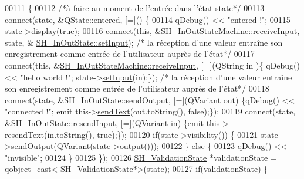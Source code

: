 \begin{DoxyCode}
00111 \{
00112     \textcolor{comment}{/*à faire au moment de l'entrée dans l'état state*/}
00113     connect(state, &QState::entered, [=]() \{
00114         qDebug() << \textcolor{stringliteral}{"entered !"};
00115         state->\hyperlink{classSH__InOutState_a918e8a7f5fe00dc16004e46eeee1281d}{display}(\textcolor{keyword}{true});
00116         connect(\textcolor{keyword}{this}, &\hyperlink{classSH__InOutStateMachine_ab224e4a6ab99c15770bc63e1b8fdb771}{SH\_InOutStateMachine::receiveInput}, state, &
      \hyperlink{classSH__InOutState_a0206ab7d5616f28b0da7bfd5451614e8}{SH\_InOutState::setInput}); \textcolor{comment}{/* la réception d'une valeur entraîne son enregistrement
       comme entrée de l'utilisateur auprès de l'état*/}
00117         connect(\textcolor{keyword}{this}, &\hyperlink{classSH__InOutStateMachine_ab224e4a6ab99c15770bc63e1b8fdb771}{SH\_InOutStateMachine::receiveInput}, [=](QString in
      )\{ qDebug() << \textcolor{stringliteral}{"hello world !"}; state->\hyperlink{classSH__InOutState_a0206ab7d5616f28b0da7bfd5451614e8}{setInput}(in);\}); \textcolor{comment}{/* la réception d'une valeur entraîne son
       enregistrement comme entrée de l'utilisateur auprès de l'état*/}
00118         connect(state, &\hyperlink{classSH__InOutState_ad40e929a5537eb1d4883d5aa6eee5b15}{SH\_InOutState::sendOutput}, [=](QVariant out) \{qDebug() << \textcolor{stringliteral}{
      "connected !"}; emit this->\hyperlink{classSH__InOutStateMachine_ae2cbbe3cd207158668dcb4838938c7ad}{sendText}(out.toString(), \textcolor{keyword}{false});\});
00119         connect(state, &\hyperlink{classSH__InOutState_afa791181eb61a18d4337a04827f9b200}{SH\_InOutState::resendInput}, [=](QVariant in) \{emit this->
      \hyperlink{classSH__InOutStateMachine_a526822c66b46aa0cd81ba4473fa5573f}{resendText}(in.toString(), \textcolor{keyword}{true});\});
00120         \textcolor{keywordflow}{if}(state->\hyperlink{classSH__InOutState_a8c496b2fe21a51a587c6e4409c0f37ec}{visibility}()) \{
00121             state->\hyperlink{classSH__InOutState_ad40e929a5537eb1d4883d5aa6eee5b15}{sendOutput}(QVariant(state->\hyperlink{classSH__InOutState_a1a2fd4f34484125058e20730aaee7e46}{output}()));
00122         \} \textcolor{keywordflow}{else} \{
00123             qDebug() << \textcolor{stringliteral}{"invisible"};
00124         \}
00125     \});
00126     \hyperlink{classSH__ValidationState}{SH\_ValidationState} *validationState = qobject\_cast<
      \hyperlink{classSH__ValidationState}{SH\_ValidationState}*>(state);
00127     \textcolor{keywordflow}{if}(validationState) \{

\end{DoxyCode}
